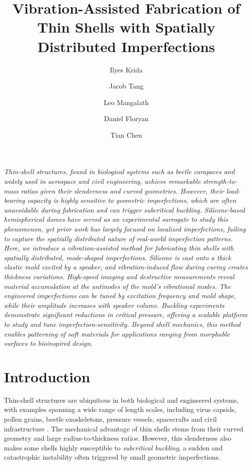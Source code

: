 \documentclass[twocolumn,letter,11pt]{article}
\title{Vibration-Assisted Fabrication of Thin Shells with Spatially Distributed Imperfections}
\author[1]{Ilyes Krida}
\author[2]{Jacob Tang}
\author[1]{Leo Mangalath}
\author[1]{Daniel Floryan}
\author[1,3*]{Tian Chen}
\affil[1]{Department of Mechanical \& Aerospace Engineering, University of Houston}
\affil[2]{Department of Aerospace \& Mechanical Engineering, University of Southern California}
\affil[3]{Department of Aeronautics, Imperial College London}
\affil[*]{Corresponding author: tian.chen@imperial.ac.uk}
\date{}
\begin{document}
\maketitle

\textit{Thin-shell structures, found in biological systems such as beetle carapaces and widely used in aerospace and civil engineering, achieve remarkable strength-to-mass ratios given their slenderness and curved geometries. However, their load-bearing capacity is highly sensitive to geometric imperfections, which are often unavoidable during fabrication and can trigger subcritical buckling. Silicone-based hemispherical domes have served as an experimental surrogate to study this phenomenon, yet prior work has largely focused on localized imperfections, failing to capture the spatially distributed nature of real-world imperfection patterns. Here, we introduce a vibration-assisted method for fabricating thin shells with spatially distributed, mode-shaped imperfections. Silicone is cast onto a thick elastic mold excited by a speaker, and vibration-induced flow during curing creates thickness variations. High-speed imaging and destructive measurements reveal material accumulation at the antinodes of the mold's vibrational modes. The engineered imperfections can be tuned by excitation frequency and mold shape, while their amplitude increases with speaker volume. Buckling experiments demonstrate significant reductions in critical pressure, offering a scalable platform to study and tune imperfection-sensitivity. Beyond shell mechanics, this method enables patterning of soft materials for applications ranging from morphable surfaces to bioinspired design.}

\section*{Introduction}

Thin-shell structures are ubiquitous in both biological and engineered systems, with examples spanning a wide range of length scales, including virus capsids, pollen grains, beetle exoskeletons, pressure vessels, spacecrafts and civil infrastructure \cite{lidmar2003virus, katifori2010foldable, adriaenssens2014shell, pellegrino2015folding}. The mechanical advantage of thin shells stems from their curved geometry and large radius-to-thickness ratios. However, this slenderness also makes some shells highly susceptible to \textit{subcritical buckling}, a sudden and catastrophic instability often triggered by small geometric imperfections.
\end{document}
